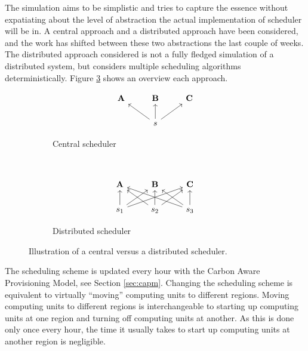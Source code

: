 The simulation aims to be simplistic and tries to capture the essence without 
expatiating about the level of abstraction the actual implementation of scheduler will be in. A central approach and a distributed approach have been considered, and the work has shifted between these two abstractions the last couple of weeks. The distributed approach considered is not a fully fledged simulation of a distributed system, but considers multiple scheduling algorithms deterministically. Figure \ref{fig:scheduling_approach} shows an overview each approach.

\begin{figure}[H]
    \centering
    \begin{subfigure}[t]{0.25\textwidth}
        \centering
\[\begin{tikzcd}
	{\textbf A} & {\textbf B} & {\textbf C} \\
	& {s}
	\arrow[from=2-2, to=1-1]
	\arrow[from=2-2, to=1-2]
	\arrow[from=2-2, to=1-3]
\end{tikzcd}\]
        \caption{Central scheduler}
        \label{fig:central_scheduler}
    \end{subfigure}%
    ~ 
    \begin{subfigure}[t]{0.25\textwidth}
        \centering
\[\begin{tikzcd}
	{\textbf A} & {\textbf B} & {\textbf C} \\
	{s_1} & {s_2} & {s_3}
	\arrow[from=2-2, to=1-1]
	\arrow[from=2-2, to=1-2]
	\arrow[from=2-2, to=1-3]
	\arrow[from=2-1, to=1-1]
	\arrow[from=2-1, to=1-2]
	\arrow[from=2-1, to=1-3]
	\arrow[from=2-3, to=1-1]
	\arrow[from=2-3, to=1-2]
	\arrow[from=2-3, to=1-3]
\end{tikzcd}\]
        \caption{Distributed scheduler}
        \label{fig:distrbuted_scheduler}
    \end{subfigure}
    \caption{Illustration of a central versus a distributed scheduler. }
    \label{fig:scheduling_approach}
\end{figure}

The scheduling scheme is updated every hour with the Carbon Aware Provisioning Model, see Section \ref{sec:capm}. Changing the scheduling scheme is equivalent to virtually ``moving'' computing units to different regions. Moving computing units to different regions is interchangeable to starting up computing units at one region and turning off computing units at another. 
As this is done only once every hour, the time it usually takes to start up computing units at another region is negligible. 

